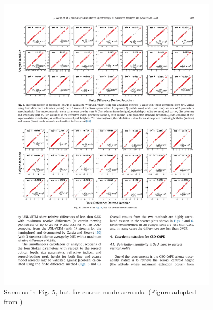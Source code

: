 \begin{landscape}
\begin{figure}[p]
  \centering
  \includegraphics[width={1.4\textwidth}]{figures/unlvrtm5.pdf}
  \caption{Same as in Fig. 5, but for coarse mode aerosols.
(Figure adopted from \citet{Wang14}) }
  \label{fig:unlvrtm5}
\end{figure}
\end{landscape}
